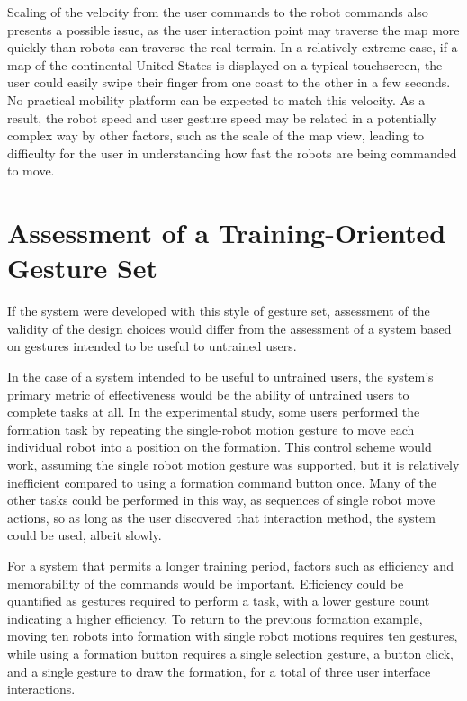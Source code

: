 Scaling of the velocity from the user commands to the robot commands also presents a possible issue, as the user interaction point may traverse the map more quickly than robots can traverse the real terrain. 
In a relatively extreme case, if a map of the continental United States is displayed on a typical touchscreen, the user could easily swipe their finger from one coast to the other in a few seconds. 
No practical mobility platform can be expected to match this velocity. 
As a result, the robot speed and user gesture speed may be related in a potentially complex way by other factors, such as the scale of the map view, leading to difficulty for the user in understanding how fast the robots are being commanded to move. 

\section{Assessment of a Training-Oriented Gesture Set}

If the system were developed with this style of gesture set, assessment of the validity of the design choices would differ from the assessment of a system based on gestures intended to be useful to untrained users. 

In the case of a system intended to be useful to untrained users, the system's primary metric of effectiveness would be the ability of untrained users to complete tasks at all. 
In the experimental study, some users performed the formation task by repeating the single-robot motion gesture to move each individual robot into a position on the formation. 
This control scheme would work, assuming the single robot motion gesture was supported, but it is relatively inefficient compared to using a formation command button once. 
Many of the other tasks could be performed in this way, as sequences of single robot move actions, so as long as the user discovered that interaction method, the system could be used, albeit slowly. 

For a system that permits a longer training period, factors such as efficiency and memorability of the commands would be important. 
Efficiency could be quantified as gestures required to perform a task, with a lower gesture count indicating a higher efficiency.
To return to the previous formation example, moving ten robots into formation with single robot motions requires ten gestures, while using a formation button requires a single selection gesture, a button click, and a single gesture to draw the formation, for a total of three user interface interactions.  

